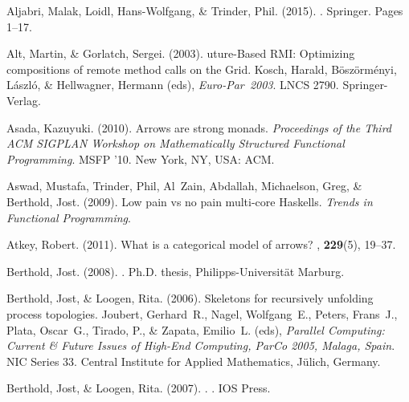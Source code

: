 \documentclass{jfp1}
\begin{document}
\begin{thebibliography}{}
Aljabri, Malak, Loidl, Hans-Wolfgang, \& Trinder, Phil. (2015).
.
\newblock Springer.
\newblock Pages  1--17.

Alt, Martin, \& Gorlatch, Sergei. (2003).
uture-{B}ased {RMI}: Optimizing compositions of remote method
  calls on the {G}rid.
 Kosch, Harald, B{\"o}sz{\"o}rm{\'e}nyi,
  L{\'a}szl{\'o}, \& Hellwagner, Hermann (eds), {\em Euro-Par~2003}.
\newblock LNCS 2790.
\newblock Springer-Verlag.

Asada, Kazuyuki. (2010).
\newblock Arrows are strong monads.
 {\em Proceedings of the Third ACM SIGPLAN
  Workshop on Mathematically Structured Functional Programming}.
\newblock MSFP '10.
\newblock New York, NY, USA: ACM.

Aswad, Mustafa, Trinder, Phil, Al~Zain, Abdallah, Michaelson, Greg, \&
  Berthold, Jost. (2009).
\newblock Low pain vs no pain multi-core {Haskells}.
 {\em Trends in Functional Programming}.

Atkey, Robert. (2011).
\newblock What is a categorical model of arrows?
, {\bf 229}(5),
  19--37.

Berthold, Jost. (2008).
.
\newblock Ph.D. thesis, Philipps-Universit\"{a}t Marburg.

Berthold, Jost, \& Loogen, Rita. (2006).
\newblock Skeletons for recursively unfolding process topologies.
\newblock  Joubert, Gerhard~R., Nagel, Wolfgang~E., Peters, Frans~J., Plata,
  Oscar~G., Tirado, P., \& Zapata, Emilio~L. (eds), {\em Parallel Computing:
  Current \& Future Issues of High-End Computing, ParCo 2005, Malaga, Spain}.
\newblock NIC Series 33.
\newblock Central Institute for Applied Mathematics, J{\"u}lich, Germany.

Berthold, Jost, \& Loogen, Rita. (2007).
.
.
\newblock IOS Press.


\end{thebibliography}
\end{document}
